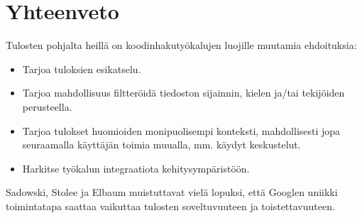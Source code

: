 \documentclass[finnish]{../tktltiki2}
\theoremstyle{definition}
\theoremstyle{remark}
\begin{document}
\section{Yhteenveto}

Tulosten pohjalta heillä on koodinhakutyökalujen luojille muutamia ehdoituksia:
\begin{itemize}
    \item Tarjoa tuloksien esikatselu.
    \item Tarjoa mahdollisuus filtteröidä tiedoston sijainnin, kielen ja/tai tekijöiden perusteella.
    \item Tarjoa tulokset huomioiden monipuolisempi konteksti, mahdollisesti jopa seuraamalla käyttäjän toimia muualla, mm. käydyt keskustelut.
    \item Harkitse työkalun integraatiota kehitysympäristöön.
\end{itemize}

Sadowski, Stolee ja Elbaum muistuttavat vielä lopuksi, että Googlen uniikki toimintatapa saattaa vaikuttaa tulosten soveltuvuuteen ja toistettavuuteen.

%
%
% 
%






%
\end{document}
